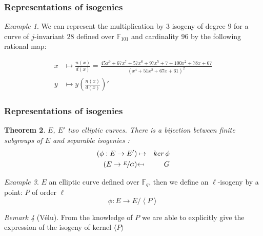 \documentclass[10pt,a4paper]{beamer}
\theoremstyle{plain}
\newtheorem{thm}{Theorem}[part]
\theoremstyle{definition}
\theoremstyle{definition}
\theoremstyle{definition}
\theoremstyle{definition}
\theoremstyle{remark}
\newtheorem{rem}[thm]{Remark}
\theoremstyle{remark}
\newtheorem{exe}[thm]{Example}
\begin{document}
\begin{frame}
\frametitle{Representations of isogenies}
\begin{exe}
We can represent the multiplication by $3$ isogeny of degree $9$ for a curve of $j$-invariant $28$ defined over $\mathbb{F}_{101}$  and cardinality $96$ by the following rational map:

\begin{align*}
x &\mapsto \frac{n(x)}{d(x)}= \frac{45x^9+67x^7+57x^6+97x^5+7+100x^2+78x+67}{(x^4+51x^2+67x+61)^2} \\
y &\mapsto y\left(\frac{n(x)}{d(x)}\right)'
\end{align*}
\end{exe}


\end{frame}

\begin{frame}
\frametitle{Representations of isogenies}
\begin{thm} 
$E$, $E'$ two elliptic curves. There is a bijection between finite subgroups of $E$ and separable isogenies :
\begin{eqnarray*}
(\phi :E\rightarrow E') &\mapsto&  ker\, \phi  \\
 (E\rightarrow\nicefrac{E}{G})  &\reflectbox{$\mapsto$}&  G 
\end{eqnarray*}
\end{thm}

\begin{exe} 
$E$ an elliptic curve defined over $\mathbb{F}_q$, then we define an $\ell$-isogeny by a point: $P$ of order $\ell$
\[ \phi: E \rightarrow E/ \left\langle P \right\rangle \]
\end{exe}

\begin{rem}[V\'elu]
From the knowledge of $P$ we are able to explicitly give the expression of the isogeny of kernel $\langle P \rangle$
\end{rem}
\end{frame}
\end{document}
